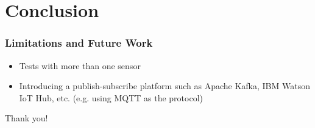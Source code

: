 \documentclass[xelatex,usenames,dvipsnames]{beamer}
\begin{document}
  \section{Conclusion}
  \begin{frame}
    \frametitle{Limitations and Future Work}
    \begin{itemize}
      \item Tests with more than one sensor
      \item Introducing a publish-subscribe platform such as Apache Kafka, IBM Watson IoT Hub, etc. (e.g. using MQTT as the protocol)
    \end{itemize}
    
  
  \end{frame}







  \begin{frame}[standout]
    Thank you!
  \end{frame}



\end{document}
